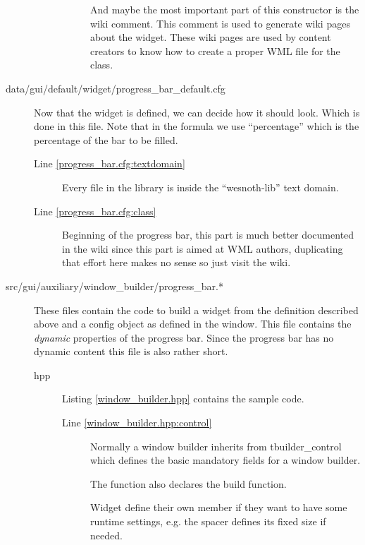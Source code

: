 \documentclass[a4paper,notitlepage]{report}
\begin{document}
\begin{description}
\begin{description}
\begin{description}
		And maybe the most important part of this constructor is the wiki
		comment. This comment is used to generate wiki pages about the widget.
		These wiki pages are used by content creators to know how to create a
		proper WML file for the class.
	\end{description}
\end{description}

\item[data/gui/default/widget/progress\_bar\_default.cfg]
	Now that the widget is defined, we can decide how it should look. Which is
	done in this file. Note that in the formula we use ``percentage'' which is
	the percentage of the bar to be filled.

	\begin{description}
	\item[Line \ref{progress_bar.cfg:textdomain}] Every file in the library
		is inside the ``wesnoth-lib'' text domain.

	\item[Line \ref{progress_bar.cfg:class}]
		Beginning of the progress bar, this part is much better documented in
		the wiki %
		since this part is aimed at WML authors, duplicating that effort here
		makes no sense so just visit the wiki.

	\end{description}

\item[src/gui/auxiliary/window\_builder/progress\_bar.*]
	These files contain the code to build a widget from the definition described
	above and a config object as defined in the window. This file contains the
	\emph{dynamic} properties of the progress bar. Since the progress bar has no
	dynamic content this file is also rather short.

\begin{description}
\item[hpp] Listing \ref{window_builder.hpp} contains the sample code. 
	\begin{description}
	\item[Line \ref{window_builder.hpp:control}] Normally a
		window builder inherits from tbuilder\_control which defines the
		basic mandatory fields for a window builder.

		The function also declares the build function.

		Widget define their own member if they want to have some runtime
		settings, e.g. the spacer defines its fixed size if needed.
	\end{description}


\end{description}
\end{description}
\end{document}
